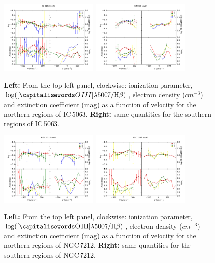 \documentclass[../main.tex]{subfiles}
\begin{document}
\begin{figure}
\centering
\includegraphics[width=0.43\textwidth]{images/paper1/IC5063_all_n.pdf} \quad
\includegraphics[width=0.43\textwidth]{images/paper1/IC5063_all_s.pdf}\\
\caption[]{\textbf{Left:} From the top left panel, clockwise: ionization parameter, $\log([\ion{O}{III}]\lambda5007/ \Hb)$, electron density ($\si{cm^{-3}}$) and extinction coefficient (mag) as a function of velocity for the northern regions of IC\,5063. \textbf{Right:} same quantities for the southern regions of IC\,5063.}
\label{fig:all_ns}
\end{figure}

\begin{figure}
\centering
\includegraphics[width=0.43\textwidth]{images/paper1/NGC7212_all_n.pdf} \quad
\includegraphics[width=0.43\textwidth]{images/paper1/NGC7212_all_s.pdf}\\
\caption[]{\textbf{Left:} From the top left panel, clockwise: ionization parameter, $\log([\rm \ion{O}{III}]\lambda5007/ \Hb)$, electron density ($\si{cm^{-3}}$) and extinction coefficient (mag) as a function of velocity for the northern regions of NGC\,7212. \textbf{Right:} same quantities for the southern regions of NGC\,7212.}
\label{fig:all_ns_N}
\end{figure}
\end{document}
